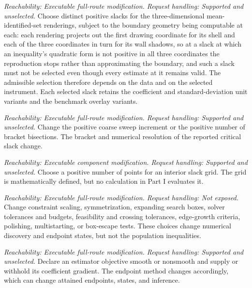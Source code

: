 \documentclass[11pt]{article}
\begin{document}
\begin{description}[style=nextline]
\item[Three-dimensional region slacks.]
\emph{Reachability: Executable full-route modification. Request handling: Supported and unselected.}
Choose distinct positive slacks for the three-dimensional mean-identified-set renderings, subject to the
boundary geometry being computable at each: each rendering projects out the first drawing coordinate
for its shell and each of the three coordinates in turn for its wall shadows, so at a slack at which
an inequality's quadratic form is not positive in all three coordinates the reproduction stops rather
than approximating the boundary, and such a slack must not be selected even though every estimate at
it remains valid. The
admissible selection therefore depends
on the data and on the selected instrument. Each selected slack
retains the coefficient and standard-deviation unit variants and the benchmark overlay variants.

\item[Critical-slack resolution.]
\emph{Reachability: Executable full-route modification. Request handling: Supported and unselected.}
Change the positive coarse sweep increment or the positive number of bracket bisections. The
bracket and numerical resolution of the reported critical slack change.

\item[Unused interior fine grid.]
\emph{Reachability: Executable component modification. Request handling: Supported and unselected.}
Choose a positive number of points for an interior slack grid. The grid is mathematically defined,
but no calculation in Part I evaluates it.

\item[Mean-set numerical controls.]
\emph{Reachability: Executable full-route modification. Request handling: Not exposed.}
Change constraint scaling, symmetrization, expanding search boxes, solver tolerances and budgets,
feasibility and crossing tolerances, edge-growth criteria, polishing, multistarting, or box-escape
tests. These choices change numerical discovery and endpoint states, but not the population
inequalities.

\item[Objective smoothness and gradient declaration.]
\emph{Reachability: Executable full-route modification. Request handling: Supported and unselected.}
Declare an estimator objective smooth or nonsmooth and supply or withhold its coefficient gradient.
The endpoint method changes accordingly, which can change attained endpoints, states, and inference.


\end{description}
\end{document}
